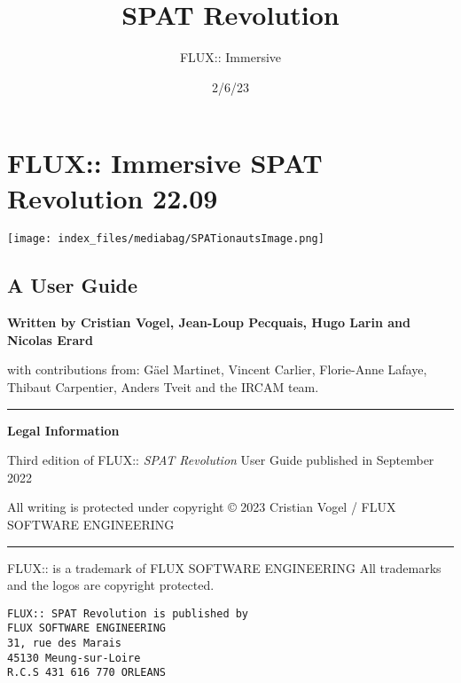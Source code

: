 \documentclass[
  letterpaper,
  DIV=11,
  numbers=noendperiod]{scrreport}
\title{SPAT Revolution}
\author{FLUX:: Immersive}
\date{2/6/23}
\renewcommand*\contentsname{Table of contents}
\newcommand\contentsname{Table of contents}
\begin{document}
\maketitle
\ifdefined\Shaded\renewenvironment{Shaded}{\begin{tcolorbox}[frame hidden, enhanced, sharp corners, interior hidden, boxrule=0pt, breakable, borderline west={3pt}{0pt}{shadecolor}]}{\end{tcolorbox}}\fi

\renewcommand*\contentsname{Table of contents}
{
\hypersetup{linkcolor=}
\setcounter{tocdepth}{2}
\tableofcontents
}

\hypertarget{flux-immersive-spat-revolution-22.09}{%
\chapter{FLUX:: Immersive SPAT Revolution
22.09}\label{flux-immersive-spat-revolution-22.09}}

\texttt{[image: index\_files/mediabag/SPATionautsImage.png]}

\hypertarget{a-user-guide}{%
\section{A User Guide}\label{a-user-guide}}

\textbf{Written by Cristian Vogel, Jean-Loup Pecquais, Hugo Larin and
Nicolas Erard}

with contributions from: Gäel Martinet, Vincent Carlier, Florie-Anne
Lafaye, Thibaut Carpentier, Anders Tveit and the IRCAM team.

\begin{center}\rule{0.5\linewidth}{0.5pt}\end{center}

\textbf{Legal Information}

Third edition of FLUX:: \emph{SPAT Revolution} User Guide published in
September 2022

All writing is protected under copyright © 2023 Cristian Vogel / FLUX
SOFTWARE ENGINEERING

\begin{center}\rule{0.5\linewidth}{0.5pt}\end{center}

FLUX:: is a trademark of FLUX SOFTWARE ENGINEERING All trademarks and
the logos are copyright protected.

\begin{verbatim}
FLUX:: SPAT Revolution is published by
FLUX SOFTWARE ENGINEERING
31, rue des Marais
45130 Meung-sur-Loire
R.C.S 431 616 770 ORLEANS
\end{verbatim}
\end{document}
